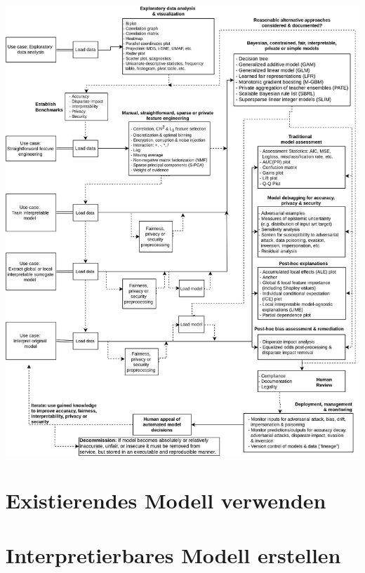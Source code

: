 \documentclass[
  12pt, %
  a4paper, %
  oneside, %
  openany, 
  numbers=noenddot, %
  BCOR=5mm, %
  parskip=half*, %
  thesis, %
]{bfhbook}
\begin{document}
\includegraphics[width=\textwidth]{Bilder/blueprint.png}

\section{Existierendes Modell verwenden}

\section{Interpretierbares Modell erstellen}
\end{document}
